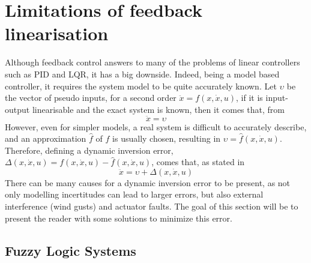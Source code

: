 \section{Limitations of feedback linearisation}
\label{section:background/limitations}
Although feedback control answers to many of the problems of linear controllers such as PID and LQR, it has a big downside. Indeed, being a model based controller, it requires the system model to be quite accurately known. Let $\upsilon$ be the vector of pseudo inputs, for a second order $\ddot{x} = f(x,\dot{x},u)$, if it is input-output linearisable and the exact system is known, then it comes that, from \cite{YANG+LIN_Adaptive_Flight_Control}
\begin{equation}
\ddot{x}=\upsilon
\end{equation}
However, even for simpler models, a real system is difficult to accurately describe, and an approximation $\hat{f}$ of $f$ is usually chosen, resulting in $\upsilon=\hat{f}(x,\dot{x},u)$. Therefore, defining a dynamic inversion error, $\Delta(x,\dot{x},u)=f(x,\dot{x},u)-\hat{f}(x,\dot{x},u)$, comes that, as stated in \cite{YANG+LIN_Adaptive_Flight_Control}
\begin{equation}
\ddot{x}=\upsilon + \Delta(x,\dot{x},u)
\end{equation}
There can be many causes for a dynamic inversion error to be present, as not only modelling incertitudes can lead to larger errors, but also external interference (wind gusts) and actuator faults. The goal of this section will be to present the reader with some solutions to minimize this error. 

\subsection{Fuzzy Logic Systems}
\label{section:background/fuzzy_logic}

